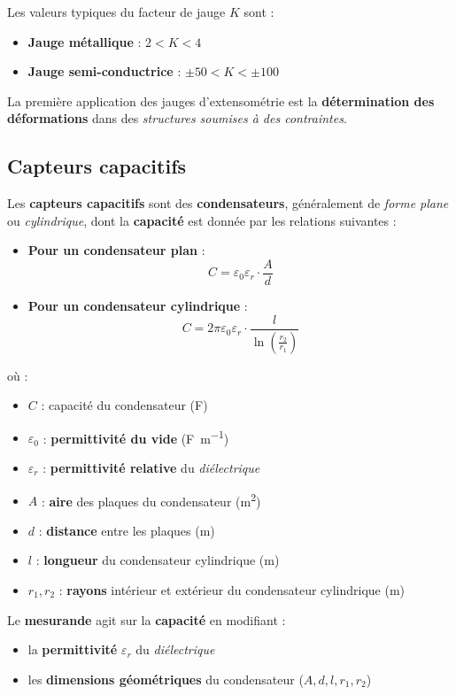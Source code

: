 Les valeurs typiques du facteur de jauge \( K \) sont :
\begin{itemize}
    \item \textbf{Jauge métallique} : \( 2 < K < 4 \)
    \item \textbf{Jauge semi-conductrice} : \( \pm 50 < K < \pm 100 \)
\end{itemize}

La première application des jauges d'extensométrie est la 
\textbf{détermination des déformations} dans des 
\textit{structures soumises à des contraintes}.

\subsection*{Capteurs capacitifs}

Les \textbf{capteurs capacitifs} sont des \textbf{condensateurs}, généralement 
de \textit{forme plane} ou \textit{cylindrique}, dont la \textbf{capacité} est 
donnée par les relations suivantes :

\begin{itemize}
    \item \textbf{Pour un condensateur plan} :
    \begin{equation}
        C = \varepsilon_0 \varepsilon_r \cdot \frac{A}{d}
    \end{equation}
    
    \item \textbf{Pour un condensateur cylindrique} :
    \begin{equation}
        C = 2 \pi \varepsilon_0 \varepsilon_r \cdot \frac{l}{\ln \left( \frac{r_2}{r_1} \right)}
    \end{equation}
\end{itemize}

où :
\begin{itemize}
    \item \( C \) : capacité du condensateur (\si{\farad})
    \item \( \varepsilon_0 \) : \textbf{permittivité du vide} (\si{\farad\per\meter})
    \item \( \varepsilon_r \) : \textbf{permittivité relative} du \textit{diélectrique}
    \item \( A \) : \textbf{aire} des plaques du condensateur (\si{\meter\squared})
    \item \( d \) : \textbf{distance} entre les plaques (\si{\meter})
    \item \( l \) : \textbf{longueur} du condensateur cylindrique (\si{\meter})
    \item \( r_1, r_2 \) : \textbf{rayons} intérieur et extérieur du condensateur cylindrique (\si{\meter})
\end{itemize}

Le \textbf{mesurande} agit sur la \textbf{capacité} en modifiant :
\begin{itemize}
    \item la \textbf{permittivité} \( \varepsilon_r \) du \textit{diélectrique}
    \item les \textbf{dimensions géométriques} du condensateur (\( A, d, l, r_1, r_2 \))
\end{itemize}

